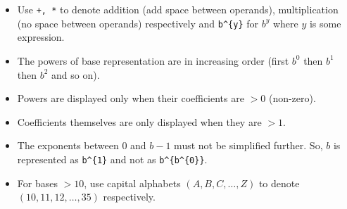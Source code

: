\begin{itemize}
\item Use \verb!+, *! to denote addition (add space between operands), multiplication (no space between operands) respectively and \verb!b^{y}! for $b^y$ where $y$ is some expression.
\item The powers of base representation are in increasing order (first $b^0$ then $b^1$ then $b^2$ and so on).
\item Powers are displayed only when their coefficients are $>0$ (non-zero).
\item Coefficients themselves are only displayed when they are $>1$.
\item The exponents between 0 and $b-1$ must not be simplified further. So, $b$ is represented as \verb!b^{1}! and not as \verb!b^{b^{0}}!.
\item For bases $>10$, use capital alphabets $(A,B,C,\ldots,Z)$ to denote $(10,11,12,\ldots,35)$ respectively.
\end{itemize}
